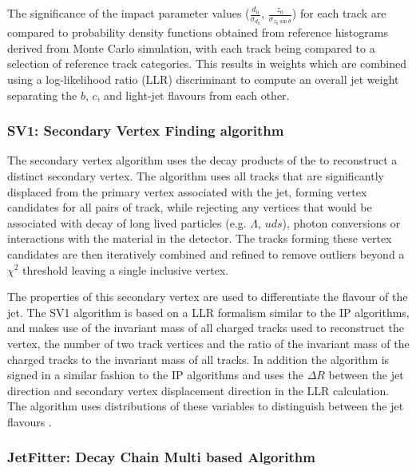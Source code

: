 		The significance of the impact parameter values ($\frac{d_0}{\sigma_{d_0}}$, $\frac{z_0}{\sigma_{z_0\sin\theta}}$) for each track are compared to probability density functions obtained from reference histograms derived from Monte Carlo simulation, with each track being compared to a selection of reference track categories. This results in weights which are combined using a log-likelihood ratio (LLR) discriminant to compute an overall jet weight separating the $b$, $c$, and light-jet flavours from each other. \cite{btagOptimisation, bTagPerformance}

	\subsubsection{SV1: Secondary Vertex Finding algorithm}
	\label{det:btag:sv}

		The secondary vertex algorithm uses the decay products of the \bhadron to reconstruct a distinct secondary vertex. The algorithm uses all tracks that are significantly displaced from the primary vertex associated with the jet, forming vertex candidates for all pairs of track, while rejecting any vertices that would be associated with decay of long lived particles (e.g. $\Lambda$, $uds$), photon conversions or interactions with the material in the detector. The tracks forming these vertex candidates are then iteratively combined and refined to remove outliers beyond a $\chi^2$ threshold leaving a single inclusive vertex.

		The properties of this secondary vertex are used to differentiate the flavour of the jet. The SV1 algorithm is based on a LLR formalism similar to the IP algorithms, and makes use of the invariant mass of all charged tracks used to reconstruct the vertex, the number of two track vertices and the ratio of the invariant mass of the charged tracks to the invariant mass of all tracks. In addition the algorithm is signed in a similar fashion to the IP algorithms and uses the $\Delta R$ between the jet direction and secondary vertex displacement direction in the LLR calculation. The algorithm uses distributions of these variables to distinguish between the jet flavours \cite{btagOptimisation, bTagPerformance}.

	\subsubsection{JetFitter: Decay Chain Multi based Algorithm}
	\label{det:btag:jf}

